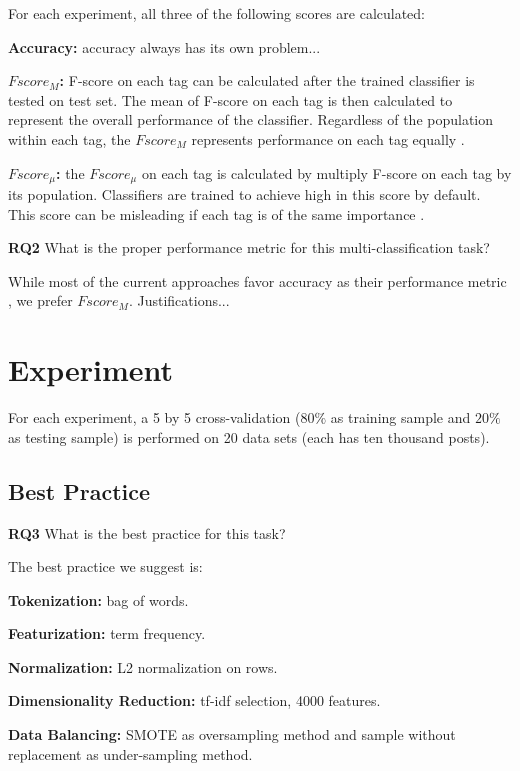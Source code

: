 \documentclass{sig-alternate-05-2015}
\begin{document}
For each experiment, all three of the following scores are calculated:

\textbf{Accuracy:} accuracy always has its own problem...

\textbf{$Fscore_{M}$:} F-score on each tag can be calculated after the trained classifier is tested on test set. The mean of F-score on each tag is then calculated to represent the overall performance of the classifier. Regardless of the population within each tag, the $Fscore_{M}$ represents performance on each tag equally \cite{sokolova2009systematic}.

\textbf{$Fscore_{\mu}$:} the $Fscore_{\mu}$ on each tag is calculated by multiply F-score on each tag by its population. Classifiers are trained to achieve high in this score by default. This score can be misleading if each tag is of the same importance \cite{sokolova2009systematic}.

\textbf{RQ2} What is the proper performance metric for this multi-classification task?

While most of the current approaches favor accuracy as their performance metric \cite{stanley2013predicting,kuo2011word}, we prefer $Fscore_{M}$. Justifications...

\section{Experiment}
\label{sec:Experiment}

For each experiment, a 5 by 5 cross-validation ($80\%$ as training sample and $20\%$ as testing sample) is performed on 20 data sets (each has ten thousand posts).

\subsection{Best Practice}

\textbf{RQ3} What is the best practice for this task?

The best practice we suggest is:

\textbf{Tokenization:} bag of words.

\textbf{Featurization:} term frequency.

\textbf{Normalization:} L2 normalization on rows.

\textbf{Dimensionality Reduction:} tf-idf selection, 4000 features.

\textbf{Data Balancing:} SMOTE as oversampling method and sample without replacement as under-sampling method.
\end{document}
